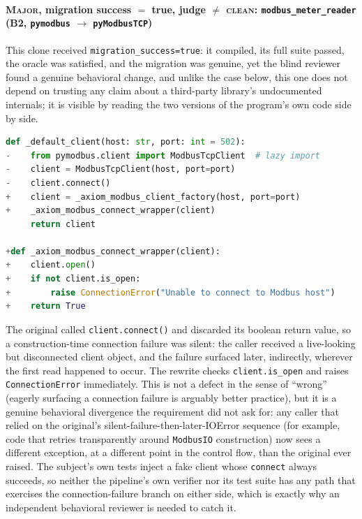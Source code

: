 \paragraph{\textsc{Major}, migration success $=$ true, judge $\neq$ \textsc{clean}: \texttt{modbus\_meter\_reader} (B2, \texttt{pymodbus} $\rightarrow$ \texttt{pyModbusTCP})}
This clone received \texttt{migration\_success=true}: it compiled, its full suite passed, the oracle was satisfied, and the migration was genuine, yet the blind reviewer found a genuine behavioral change, and unlike the case below, this one does not depend on trusting any claim about a third-party library's undocumented internals; it is visible by reading the two versions of the program's own code side by side.

\begin{lstlisting}[language=Python, basicstyle=\ttfamily\scriptsize, breaklines=true, frame=single]
 def _default_client(host: str, port: int = 502):
-    from pymodbus.client import ModbusTcpClient  # lazy import
-    client = ModbusTcpClient(host, port=port)
-    client.connect()
+    client = _axiom_modbus_client_factory(host, port=port)
+    _axiom_modbus_connect_wrapper(client)
     return client

+def _axiom_modbus_connect_wrapper(client):
+    client.open()
+    if not client.is_open:
+        raise ConnectionError("Unable to connect to Modbus host")
+    return True
\end{lstlisting}
The original called \texttt{client.connect()} and discarded its boolean return value, so a construction-time connection failure was silent: the caller received a live-looking but disconnected client object, and the failure surfaced later, indirectly, wherever the first read happened to occur. The rewrite checks \texttt{client.is\_open} and raises \texttt{ConnectionError} immediately. This is not a defect in the sense of ``wrong'' (eagerly surfacing a connection failure is arguably better practice), but it is a genuine behavioral divergence the requirement did not ask for: any caller that relied on the original's silent-failure-then-later-IOError sequence (for example, code that retries transparently around \texttt{ModbusIO} construction) now sees a different exception, at a different point in the control flow, than the original ever raised. The subject's own tests inject a fake client whose \texttt{connect} always succeeds, so neither the pipeline's own verifier nor its test suite has any path that exercises the connection-failure branch on either side, which is exactly why an independent behavioral reviewer is needed to catch it.

